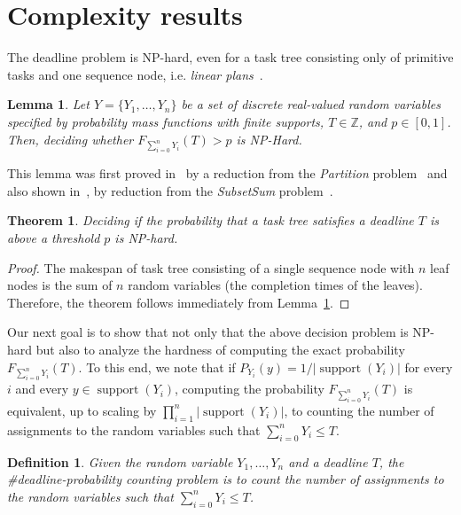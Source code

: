 \documentclass[review]{elsarticle}
\newtheorem{theorem}{Theorem}
\newtheorem{lemma}{Lemma}
\newtheorem{definition}{Definition}
\DeclareMathOperator{\support}{support}
\begin{document}
\section{Complexity results}\label{sec:complexity}

The deadline problem is NP-hard, 
even for a task tree consisting only of primitive tasks and one sequence node, i.e.
{\em linear plans}~\cite{Russell:2003:AIM:773294,simmons2001planning,aktolga2004java}. 

\begin{lemma} \label{SumDiscreteRV}
Let $Y=\{Y_1,\dots,Y_n\}$ be a set of discrete real-valued random variables  specified by probability mass functions 
with finite supports, $T \in \mathbb{Z}$, and $p\in[0,1]$. 
Then, deciding  whether $F_{\sum_{i=0}^{n} Y_{i}}(T)>p $ is NP-Hard.
\end{lemma}

This lemma was first proved in~\cite{mohring2001scheduling} by a reduction from the \textit{Partition} problem~\cite[problem number SP]{Garey:1990:CIG:574848} and also shown in~\cite{cohen2015estimating}, by reduction from the \textit{SubsetSum} problem~\cite[problem number SP13]{Garey:1990:CIG:574848}.
 
\begin{theorem}
Deciding if the probability that a task tree satisfies a deadline $T$ is above a threshold $p$ is NP-hard.
\end{theorem}

\begin{proof} The makespan of task tree consisting of a single sequence node with $n$ leaf nodes is the sum of $n$ random variables (the completion times of the leaves). Therefore, the theorem follows immediately from Lemma~\ref{SumDiscreteRV}. 
\end{proof}

Our next goal is to show that not only that the above decision problem is NP-hard but also to analyze the hardness of computing the exact probability $F_{\sum_{i=0}^{n} Y_{i}}(T)$. To this end, we note that 
if $P_{Y_i}(y)=1/|\support(Y_i)|$ for every $i$ and every $y\in\support(Y_i)$, computing the probability $F_{\sum_{i=0}^{n} Y_{i}}(T)$ is equivalent, up to scaling by $\prod_{i=1}^n |\support(Y_i)|$, to counting the number of assignments to the random variables  such that $\sum_{i=0}^{n} Y_{i} \leq T$. 

\begin{definition} 
	Given the random variable $Y_1,\dots,Y_n$ and a deadline $T$,
	the \#deadline-probability counting problem is to count the number of assignments to the random variables such that $\sum_{i=0}^{n} Y_{i} \leq T$.
\end{definition}
\end{document}
